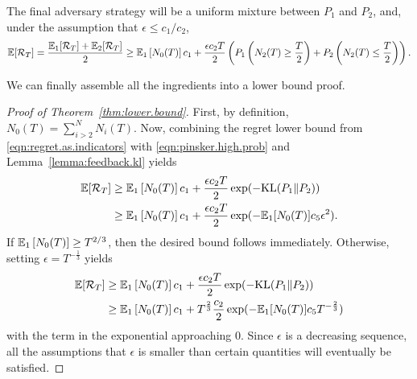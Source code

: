 \documentclass{article}
\newcommand{\KL}{\mathrm{KL}}
\newcommand{\regret}{\mathcal{R}}
\begin{document}
The final adversary strategy will be a uniform mixture between $P_1$ and $P_2$, and, under the assumption that $\epsilon\leq c_1/c_2$,
\begin{equation}
  \label{eqn:regret.as.indicators}
    \ex[\regret_T]
  =
    \frac{\ex_1[\regret_T] + \ex_2[\regret_T]}{2}
  \geq
    \ex_1\left[N_0(T)\right]c_1
    + \frac{\epsilon c_2 T}{2}
    \left(
    P_1\left(N_2(T)\geq \frac{T}{2}\right)
    +    
    P_2\left(N_2(T)\leq\frac{T}{2}\right)
    \right).
  \end{equation}
  
We can finally assemble all the ingredients into a lower bound proof.
\begin{proof}[Proof of Theorem~\ref{thm:lower.bound}]
  First, by definition, $N_0(T) = \sum_{i>2}^N N_i(T)$. Now, combining the regret lower bound from \eqref{eqn:regret.as.indicators} with \eqref{eqn:pinsker.high.prob} and Lemma~\ref{lemma:feedback.kl} yields
\begin{align*}   
  \ex[\regret_T]
&\geq
    \ex_1\left[N_0(T)\right]c_1
    + \frac{\epsilon c_2 T}{2}
  \exp(-\KL(P_1\Vert P_2) )\\
&\geq
      \ex_1\left[N_0(T)\right]c_1
    + \frac{\epsilon c_2 T}{2}
    \exp(- \ex_1[N_0(T)] c_5 \epsilon^2 ).
\end{align*}
If $\mathbb E_1\left[N_0(T)\right] \geq T^{2/3}$, then the desired bound follows immediately. Otherwise, setting $\epsilon = T^{-\frac13}$ yields 
\begin{align*}   
  \ex[\regret_T]
&\geq
    \ex_1\left[N_0(T)\right]c_1
    + \frac{\epsilon c_2 T}{2}
  \exp(-\KL(P_1\Vert P_2) )\\
&\geq
      \ex_1\left[N_0(T)\right]c_1
    +  T^{\frac23}\frac{c_2}{2}
    \exp(- \ex_1[N_0(T)] c_5 T^{-\frac23} )
\end{align*}
with the term in the exponential approaching 0. Since $\epsilon$ is a decreasing sequence, all the assumptions that $\epsilon$ is smaller than certain quantities will eventually be satisfied.
\end{proof}

\iffalse
\paragraph{A detail}\todo{remove this paragraph}
While the regret bound, proven w.r.t. the two policies $\pi_1$ and $\pi_2$ and all fixed actions, 
In particular, there exist a policy that is better that $\pi_1$ and $\pi_2$: the one that switches exactly correctly at $\beta$. To fix this, we can instead define
\[
  P_1 = q_1 \mathds{1}\{x \leq \beta-\beta_2\} + q_2 \mathds{1}\{x \geq \beta+\beta_1\}
  + \frac{q_1+q_2}{2}\mathds{1}\{\beta-\beta_2\leq x \leq \beta+\beta_1\}
\]
and analogously for $P_2$. Then the ``perfect policy'' from before does not do any better than $\pi_1$ or $\pi_2$ in expectation.

Unfortunately, this set of alternatives does not have the nice property that the feedback distribution of playing $\pi_1$ under $P_1$ and $P_2$ is identical; there is some small change from $S_1 q_a$ to $S_1 q_b$. It might be possible to balance terms and control the regret.
\fi
\end{document}
